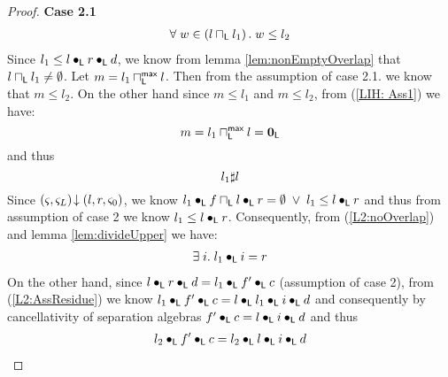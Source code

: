 \begin{lemma}[]
\begin{proof}
\noindent\textbf{Case 2.1} 
%
%
\[
\begin{array}{l}
	\forall\; w \in \left(l \sqcap_{\textsf{L}} l_1 \right).\; w \leq l_2 
\end{array}
\]
Since $l_1 \leq l \bullet_{\textsf{L}} r \bullet_{\textsf{L}} d$, we know from lemma \ref{lem:nonEmptyOverlap} that $l \sqcap_{\textsf{L}} l_1 \not= \emptyset$. Let $m = l_1 \sqcap_{\textsf{L}}^{\textsf{max}} l$. Then from the assumption of case 2.1. we know that $m \leq l_2$. On the other hand since $m \leq l_1$ and $m \leq l_2$, from (\ref{LIH: Ass1}) we have:
%
\begin{equation}
	m = l_1 \sqcap_{\textsf{L}}^{\textsf{max}} l = \mathbf{0}_{\textsf{L}} \nonumber
\end{equation} 
%
and thus
%
%
\begin{equation}
	l_1 \sharp l  \label{L2:noOverlap}
\end{equation} 
%
Since $\left(\varsigma_{}, \varsigma_{L}\right) \!\downarrow \left(l, r, \varsigma_{0}\right)$, we know $l_1 \bullet_{\textsf{L}} f \sqcap_{\textsf{L}} l \bullet_{\textsf{L}} r = \emptyset \;\lor\; l_1 \leq l \bullet_{\textsf{L}} r$ and thus from assumption of case 2 we know $l_1 \leq l \bullet_{\textsf{L}} r$. Consequently, from (\ref{L2:noOverlap}) and lemma \ref{lem:divideUpper} we have:
%
\begin{align}
	\exists\; i.\; l_1 \bullet_{\textsf{L}} i = r \label{L2:AssResidue}
\end{align}
%
On the other hand, since $l \bullet_{\textsf{L}} r \bullet_{\textsf{L}} d = l_1 \bullet_{\textsf{L}} f' \bullet_{\textsf{L}} c$ (assumption of case 2), from (\ref{L2:AssResidue}) we know $l_1 \bullet_{\textsf{L}} f' \bullet_{\textsf{L}} c = l \bullet_{\textsf{L}} l_1 \bullet_{\textsf{L}} i \bullet_{\textsf{L}} d$ and consequently by cancellativity of separation algebras $f' \bullet_{\textsf{L}} c = l \bullet_{\textsf{L}} i \bullet_{\textsf{L}} d$ and thus
%
\begin{align}
	l_2 \composeL f' \composeL c = l_2 \composeL l \composeL i \composeL d \label{L2:AssPart1}

\end{align}
\end{proof}
\end{lemma}
